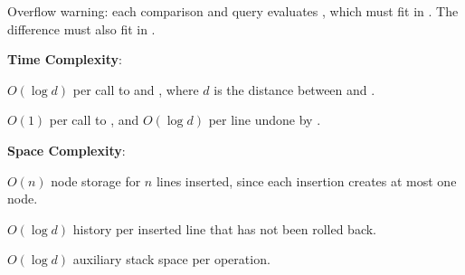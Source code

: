 Overflow warning: each comparison and query evaluates , which must fit in . The difference  must also fit in .

\textbf{Time Complexity}:
\begin{compactitem}
  \item $O(\log d)$ per call to  and , where $d$ is the distance between  and .
  \item $O(1)$ per call to , and $O(\log d)$ per line undone by .
\end{compactitem}

\textbf{Space Complexity}:
\begin{compactitem}
  \item $O(n)$ node storage for $n$ lines inserted, since each insertion creates at most one node.
  \item $O(\log d)$ history per inserted line that has not been rolled back.
  \item $O(\log d)$ auxiliary stack space per operation.
\end{compactitem}

